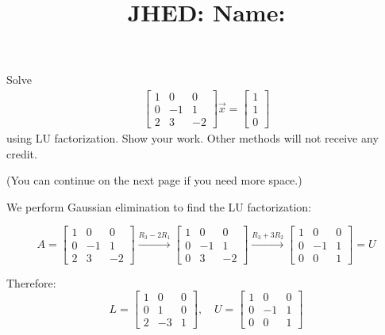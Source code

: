 \documentclass[reqno]{exam}
\title{\normalsize{
  JHED: \underline{\hspace{4cm}} \hspace{1em} Name: \underline{\hspace{9cm}}}
   }
\author{}
\date{}
\begin{document}
\maketitle
\vspace{-2cm} %

\begin{questions}

  \question[15] Solve
  \begin{align*}
    \begin{bmatrix} 1 & 0 & 0 \\ 0 & -1 & 1 \\ 2 & 3 & -2 \end{bmatrix} \vec{x} = \begin{bmatrix} 1 \\ 1 \\ 0 \end{bmatrix}
  \end{align*}
  using LU factorization. Show your work. Other methods will not receive any credit.

  (You can continue on the next page if you need more space.)
  \begin{solution}
    We perform Gaussian elimination to find the LU factorization:

    $$A = \begin{bmatrix} 1 & 0 & 0 \\ 0 & -1 & 1 \\ 2 & 3 & -2 \end{bmatrix} \xrightarrow{R_3 - 2R_1} \begin{bmatrix} 1 & 0 & 0 \\ 0 & -1 & 1 \\ 0 & 3 & -2 \end{bmatrix} \xrightarrow{R_3 + 3R_2} \begin{bmatrix} 1 & 0 & 0 \\ 0 & -1 & 1 \\ 0 & 0 & 1 \end{bmatrix} = U$$

    Therefore:
    $$L = \begin{bmatrix} 1 & 0 & 0 \\ 0 & 1 & 0 \\ 2 & -3 & 1 \end{bmatrix}, \quad U = \begin{bmatrix} 1 & 0 & 0 \\ 0 & -1 & 1 \\ 0 & 0 & 1 \end{bmatrix}$$


\end{solution}
\end{questions}
\end{document}
